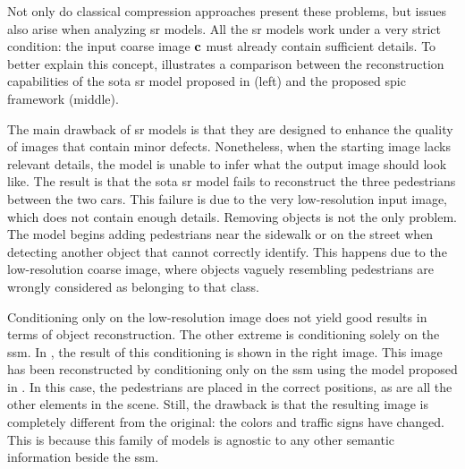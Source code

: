 Not only do classical compression approaches present these problems, but issues also arise when analyzing \gls{sr} models. All the \gls{sr} models work under a very strict condition: the input coarse image $\mathbf{c}$ must already contain sufficient details. To better explain this concept,  illustrates a comparison between the reconstruction capabilities of the \gls{sota} \gls{sr} model proposed in \cite{Rombach2022SR_CVPR} (left) and the proposed \gls{spic} framework (middle).

The main drawback of \gls{sr} models is that they are designed to enhance the quality of images that contain minor defects. Nonetheless, when the starting image lacks relevant details, the model is unable to infer what the output image should look like. The result is that the \gls{sota} \gls{sr} model fails to reconstruct the three pedestrians between the two cars. This failure is due to the very low-resolution input image, which does not contain enough details. Removing objects is not the only problem. The model begins adding pedestrians near the sidewalk or on the street when detecting another object that cannot correctly identify. This happens due to the low-resolution coarse image, where objects vaguely resembling pedestrians are wrongly considered as belonging to that class.

Conditioning only on the low-resolution image does not yield good results in terms of object reconstruction. The other extreme is conditioning solely on the \gls{ssm}. In , the result of this conditioning is shown in the right image. This image has been reconstructed by conditioning only on the \gls{ssm} using the model proposed in \cite{Wang2022SISDM}. In this case, the pedestrians are placed in the correct positions, as are all the other elements in the scene. Still, the drawback is that the resulting image is completely different from the original: the colors and traffic signs have changed. This is because this family of models is agnostic to any other semantic information beside the \gls{ssm}.

